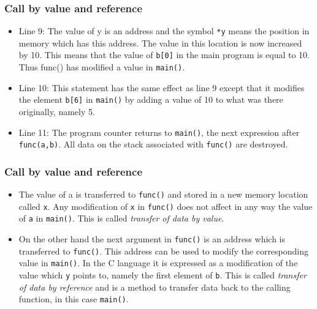 \documentclass{beamer}
\begin{document}
\begin{frame}
\frametitle{Call by value and reference}

\begin{itemize}
  \item Line 9: The value of y is an address and the symbol \Verb!*y! means the position in memory which has this address. The value in this location is now increased by 10. This means that the value of \Verb!b[0]! in the main program is equal to 10. Thus func() has modified a value in \Verb!main()!.

  \item Line 10: This statement has the same effect as line 9 except that it modifies the element \Verb!b[6]! in \Verb!main()! by adding a value of 10 to what was there originally, namely 5.

  \item Line 11: The program counter returns to \Verb!main()!, the next expression after \Verb!func(a,b)!. All data on the stack associated with \Verb!func()! are destroyed.
\end{itemize}

\noindent
\end{frame}

\begin{frame}
\frametitle{Call by value and reference}

\begin{itemize}
  \item The value of a is transferred to \Verb!func()! and stored in a new memory location called \Verb!x!. Any modification of \Verb!x! in \Verb!func()! does not affect in any way the value of \Verb!a! in \Verb!main()!. This is called \emph{transfer of data by value}.

  \item On the other hand the next argument in \Verb!func()! is an address which is transferred to \Verb!func()!. This address can be used to modify the corresponding value in \Verb!main()!. In the C language it is expressed as a modification of the value which \Verb!y! points to, namely the first element of \Verb!b!. This is called \emph{transfer of data by reference} and is a method to transfer data back to the calling function, in this case \Verb!main()!.
\end{itemize}

\noindent
\end{frame}
\end{document}

